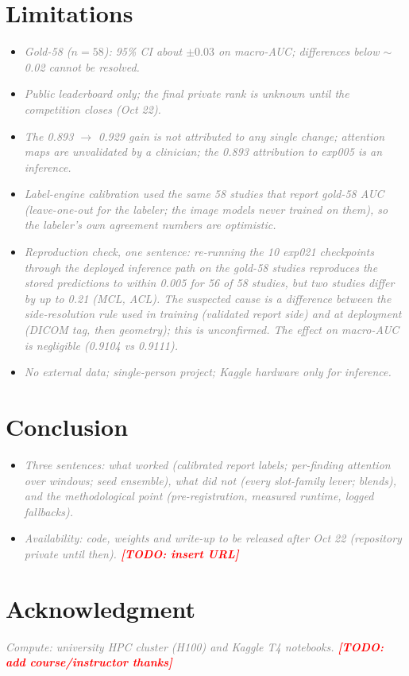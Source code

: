 \documentclass[conference]{IEEEtran}
\newcommand{\nt}[1]{\textcolor{gray}{\textit{#1}}}            %
\newcommand{\todo}[1]{\textcolor{red}{\textbf{[TODO: #1]}}}
\begin{document}
\section{Limitations}
\begin{notes}
\begin{itemize}
\item \nt{Gold-58 ($n=58$): 95\% CI about $\pm0.03$ on macro-AUC; differences below $\sim$0.02 cannot be resolved.}
\item \nt{Public leaderboard only; the final private rank is unknown until the competition closes (Oct 22).}
\item \nt{The 0.893 $\rightarrow$ 0.929 gain is not attributed to any single change; attention maps are unvalidated
by a clinician; the 0.893 attribution to exp005 is an inference.}
\item \nt{Label-engine calibration used the same 58 studies that report gold-58 AUC (leave-one-out for the labeler; the image
models never trained on them), so the labeler's own agreement numbers are optimistic.}
\item \nt{Reproduction check, one sentence: re-running the 10 exp021 checkpoints through the deployed inference path on the
gold-58 studies reproduces the stored predictions to within 0.005 for 56 of 58 studies, but two studies differ by up to
0.21 (MCL, ACL). The suspected cause is a difference between the side-resolution rule used in training (validated report
side) and at deployment (DICOM tag, then geometry); this is unconfirmed. The effect on macro-AUC is negligible (0.9104
vs 0.9111).}  %
\item \nt{No external data; single-person project; Kaggle hardware only for inference.}
\end{itemize}
\end{notes}

\section{Conclusion}
\begin{notes}
\begin{itemize}
\item \nt{Three sentences: what worked (calibrated report labels; per-finding attention over windows; seed ensemble), what
did not (every slot-family lever; blends), and the methodological point (pre-registration, measured runtime, logged
fallbacks).}
\item \nt{Availability: code, weights and write-up to be released after Oct 22 (repository private until then). \todo{insert URL}}
\end{itemize}
\end{notes}

\section*{Acknowledgment}
\nt{Compute: university HPC cluster (H100) and Kaggle T4 notebooks. \todo{add course/instructor thanks}}



\end{document}
